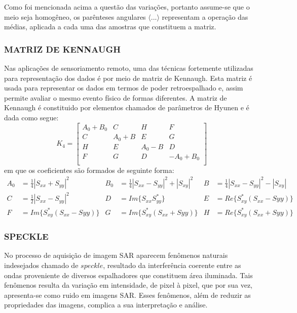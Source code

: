 \documentclass[a4paper,12pt]{article}
\begin{document}
Como foi mencionada acima a questão das variações, portanto assume-se que o meio seja homogêneo, os parênteses angulares $\langle ... \rangle$ representam a operação das médias, aplicada a cada uma das amostras que constituem a matriz.  

\subsubsection{MATRIZ DE KENNAUGH}
\label{sebsec:KenM}

Nas aplicações de sensoriamento remoto, uma das técnicas fortemente utilizadas para representação dos dados é por meio de matriz de Kennaugh. Esta matriz é usada para representar os dados em termos de poder retroespalhado e, assim permite avaliar o mesmo evento físico de formas diferentes. A matriz de Kennaugh é constituido por elementos chamados de parâmetros de Hyunen e é dada como segue:
\begin{equation}
    K_{4} = \begin{bmatrix}
                A_{0}+B_{0} & C & H & F\\
                C & A_{0}+B & E & G\\
                H & E & A_{0}-B & D\\
                F & G & D & -A_{0}+B_{0}\\
            \end{bmatrix}
\end{equation}
em que os coeficientes são formados de seguinte forma:
\begin{align*}
    A_{0}&=\frac{1}{4}|S_{xx}+S_{yy}|^2 & B_{0}&=\frac{1}{4}|S_{xx}-S_{yy}|^2+|S_{xy}|^2 & B&=\frac{1}{4}|S_{xx}-S_{yy}|^2-|S_{xy}| \\
    C&=\frac{1}{2}|S_{xx}-S_{yy}|^2 & D&=Im\{S_{xx}S^*_{yy}\} & E&=Re\{S^*_{xy}(S_{xx}-S{yy})\} \\
    F&=Im\{S^*_{xy}(S_{xx}-S{yy})\} & G&=Im\{S^*_{xy}(S_{xx}+S{yy})\} & H&=Re\{S^*_{xy}(S_{xx}+S{yy})\}
\end{align*}
\subsubsection{SPECKLE}	

No processo de aquisição de imagem SAR aparecem fenômenos naturais indesejados chamado de $speckle$, resultado da interferência coerente entre as ondas proveniente de diversos espalhadores que constituem área iluminada. Tais fenômenos resulta da variação em intensidade, de pixel à pixel, que por sua vez, apresenta-se como ruido em imagens SAR. Esses fenômenos, além de reduzir as propriedades das imagens, complica a sua interpretação e análise.
\end{document}
